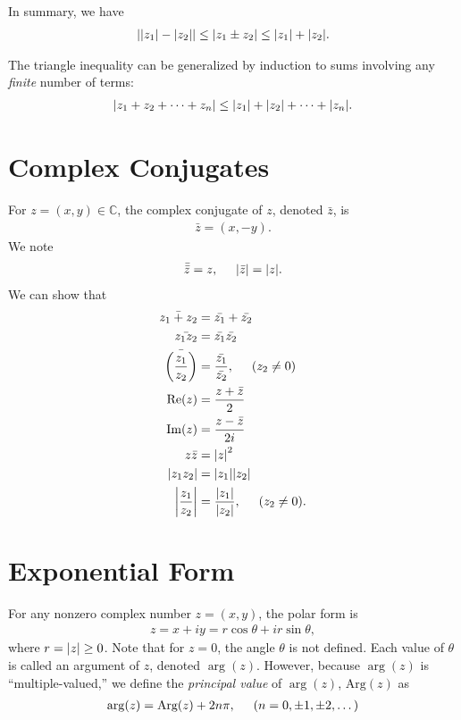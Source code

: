 \documentclass{book}
\theoremstyle{definition}
\newcommand{\Arg}{\text{Arg}}
\newcommand{\f}[2]{\frac{#1}{#2}}
\newcommand{\C}{\mathbb{C}}
\newcommand{\lp}{\left(}
\newcommand{\rp}{\right)}
\begin{document}
In summary, we have
\begin{align}
\abs{\abs{z_1} - \abs{z_2}} \leq \abs{z_1\pm z_2} \leq \abs{z_1} + \abs{z_2}.
\end{align}

The triangle inequality can be generalized by induction to sums involving any \textit{finite} number of terms:
\begin{align}
\abs{z_1 + z_2 + \dots + z_n} \leq \abs{z_1}+ \abs{z_2} + \dots + \abs{z_n}.
\end{align}








\section{Complex Conjugates}

For $z = (x,y)\in \C$, the complex conjugate of $z$, denoted $\bar{z}$, is
\begin{align}
\bar{z} = (x,-y). 
\end{align}
We note
\begin{align}
\bar{\bar{z}} = z, \hspace{0.5cm} \abs{\bar{z}} = \abs{z}.
\end{align}
We can show that
\begin{align}
\bar{z_1 + z_2} &= \bar{z_1} + \bar{z_2}\\
\bar{z_1z_2} &= \bar{z_1}\bar{z_2}\\
\bar{\lp \f{z_1}{z_2} \rp} &= \f{\bar{z_1}}{\bar{z_2}}, \hspace{0.5cm} (z_2 \neq 0)\\
\Re(z) &= \f{z + \bar{z}}{2}\\
\Im(z) &= \f{z - \bar{z}}{2i}\\
z\bar{z} &= \abs{z}^2\\
\abs{z_1 z_2} &= \abs{z_1}\abs{z_2}\\
\abs{\f{z_1}{z_2}} &= \f{\abs{z_1}}{\abs{z_2}}, \hspace{0.5cm} (z_2 \neq 0).
\end{align}





\section{Exponential Form}

For any nonzero complex number $z = (x,y)$, the polar form is 
\begin{align}
z = x + iy = r\cos\theta + ir\sin\theta,
\end{align}
where $r = \abs{z} \geq 0$. Note that for $z=0$, the angle $\theta$ is not defined. Each value of $\theta$ is called an argument of $z$, denoted $\arg(z)$. However, because $\arg(z)$ is ``multiple-valued,'' we define the \textit{principal value} of $\arg(z)$, $\Arg(z)$ as
\begin{align}
\arg(z) = \Arg(z) + 2n\pi, \hspace{0.5cm} (n = 0,\pm 1,\pm 2,\dots)
\end{align}
\end{document}
